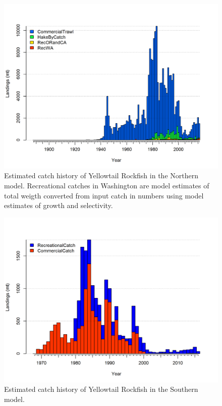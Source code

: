 \documentclass[12pt,]{article}
\begin{document}
\begin{figure}[htbp]
\centering
\includegraphics{r4ss/plots_mod1/catch2 landings stacked.png}
\caption{Estimated catch history of Yellowtail Rockfish in the Northern
model. Recreational catches in Washington are model estimates of total
weigth converted from input catch in numbers using model estimates of
growth and selectivity.\label{fig:r4ss_catch_N}}
\end{figure}

\begin{figure}[htbp]
\centering
\includegraphics{r4ss/plots_mod2/catch2 landings stacked.png}
\caption{Estimated catch history of Yellowtail Rockfish in the Southern
model. \label{fig:r4ss_catch_S}}
\end{figure}
\end{document}
